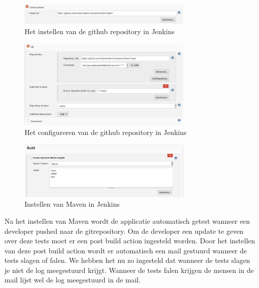 \documentclass[12pt]{article}
\begin{document}
\begin{figure}[H]
	\begin{center}
		\includegraphics[width=0.75\textwidth]{images/Jenkins-Github.png}
		\caption{Het instellen van de github repository in Jenkins\label{fig:calculator_app}}
	\end{center}
\end{figure}
\begin{figure}[H]
	\begin{center}
		\includegraphics[width=0.75\textwidth]{images/Jenkins-Github-2.png}
		\caption{Het configureren van de github repository in Jenkins\label{fig:calculator_app}}
	\end{center}
\end{figure}
\begin{figure}[H]
	\begin{center}
		\includegraphics[width=0.75\textwidth]{images/Maven.png}
		\caption{Instellen van Maven in Jenkins\label{fig:calculator_app}}
	\end{center}
\end{figure}

\noindent Na het instellen van Maven wordt de applicatie automatisch getest wanneer een developer pushed naar de gitrepository. Om de developer een update te geven over deze tests moet er een post build action ingesteld worden.
Door het instellen van deze post build action wordt er automatisch een mail gestuurd wanneer de tests slagen of falen.
We hebben het nu zo ingesteld dat wanneer de tests slagen je niet de log meegestuurd krijgt. Wanneer de tests falen krijgen de mensen in de mail lijst wel de log meegestuurd in de mail.
\end{document}
